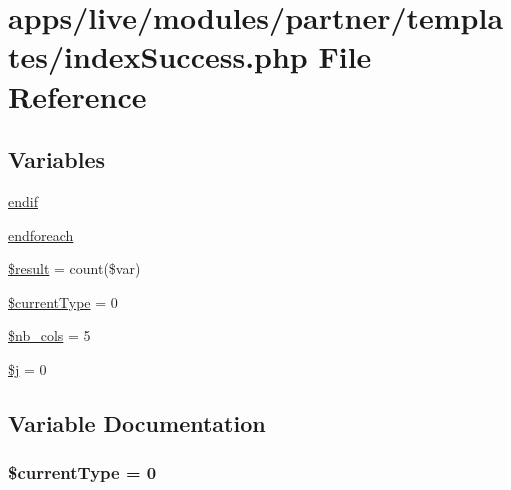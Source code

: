 \hypertarget{live_2modules_2partner_2templates_2index_success_8php}{\section{apps/live/modules/partner/templates/index\-Success.php File Reference}
\label{live_2modules_2partner_2templates_2index_success_8php}
}
\subsection*{Variables}
\begin{DoxyCompactItemize}
\item 
\hyperlink{live_2modules_2partner_2templates_2index_success_8php_a82cd33ca97ff99f2fcc5e9c81d65251b}{endif}
\item 
\hyperlink{live_2modules_2partner_2templates_2index_success_8php_a672d9707ef91db026c210f98cc601123}{endforeach}
\item 
\hyperlink{live_2modules_2partner_2templates_2index_success_8php_a112ef069ddc0454086e3d1e6d8d55d07}{\$result} = count(\$var)
\item 
\hyperlink{live_2modules_2partner_2templates_2index_success_8php_a184400a75072b656fc3d5dfc73940cdf}{\$current\-Type} = 0
\item 
\hyperlink{live_2modules_2partner_2templates_2index_success_8php_aae19e8f5b60c71816a169118a17de849}{\$nb\-\_\-cols} = 5
\item 
\hyperlink{live_2modules_2partner_2templates_2index_success_8php_a6f16db779ef3ccea921b277b5dc245d1}{\$j} = 0
\end{DoxyCompactItemize}


\subsection{Variable Documentation}
\hypertarget{live_2modules_2partner_2templates_2index_success_8php_a184400a75072b656fc3d5dfc73940cdf}{
\subsubsection[{\$current\-Type}]{\setlength{\rightskip}{0pt plus 5cm}\$current\-Type = 0}}\label{live_2modules_2partner_2templates_2index_success_8php_a184400a75072b656fc3d5dfc73940cdf}


